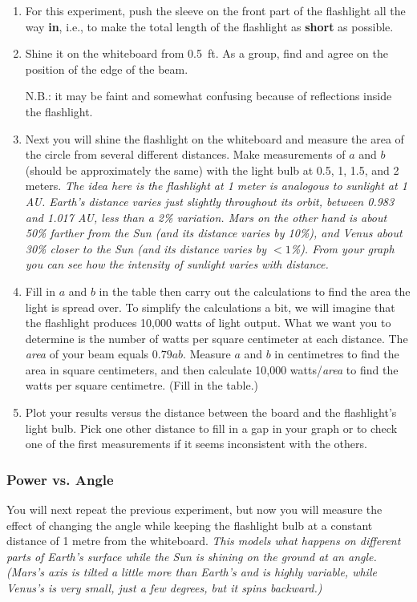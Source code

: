 \documentclass[main.tex]{subfiles}
\begin{document}
\begin{enumerate}[1.]
\item For this experiment, push the sleeve on the front part of the flashlight all the way \textbf{in}, i.e., to make the total length of the flashlight as \textbf{short} as possible.

\item Shine it on the whiteboard from \SI{0.5}{ft}. As a group, find and agree on the position of the edge of the beam.

N.B.: it may be faint and somewhat confusing because of reflections inside the flashlight.

\item Next you will shine the flashlight on the whiteboard and measure the area of the circle from several different distances. Make measurements of $a$ and $b$ (should be approximately the same) with the light bulb at 0.5, 1, 1.5, and 2 meters. \textit{The idea here is the flashlight at 1 meter is analogous to sunlight at 1 AU. Earth's distance varies just slightly throughout its orbit, between 0.983 and 1.017 AU, less than a 2\% variation. Mars on the other hand is about 50\% farther from the Sun (and its distance varies by 10\%), and Venus about 30\% closer to the Sun (and its distance varies by $<1$\%). From your graph you can see how the intensity of sunlight varies with distance.}

\item Fill in $a$ and $b$ in the table then carry out the calculations to find the area the light is spread over. To simplify the calculations a bit, we will imagine that the flashlight produces 10,000 watts of light output. What we want you to determine is the number of watts per square centimeter at each distance. The \textit{area} of your beam equals $0.79 ab$. Measure $a$ and $b$ in centimetres to find the area in square centimeters, and then calculate 10,000 watts/\textit{area} to find the watts per square centimetre. (Fill in the table.) 
\item Plot your results versus the distance between the board and the flashlight's light bulb. Pick one other distance to fill in a gap in your graph or to check one of the first measurements if it seems inconsistent with the others.

\end{enumerate}

\subsubsection{Power vs. Angle}
You will next repeat the previous experiment, but now you will measure the effect of changing the angle while keeping the flashlight bulb at a constant distance of 1 metre from the whiteboard. \textit{This models what happens on different parts of Earth's surface while the Sun is shining on the ground at an angle. (Mars's axis is tilted a little more than Earth's and is highly variable, while Venus's is very small, just a few degrees, but it spins backward.)}
\end{document}
